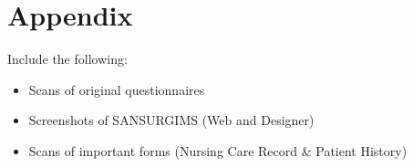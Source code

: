 \section{Appendix}

Include the following:
\begin{itemize}
\item Scans of original questionnaires
\item Screenshots of SANSURGIMS (Web and Designer)
\item Scans of important forms (Nursing Care Record \& Patient History)
\end{itemize}